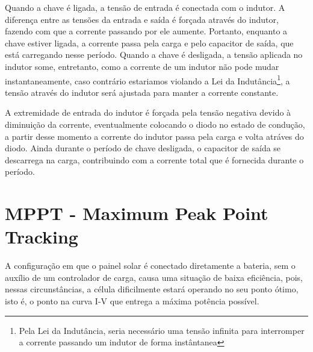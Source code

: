 \noindent
\begin{minipage}{\linewidth}
\label{buck_topology_sample}
\end{minipage}

Quando a chave é ligada, a tensão de entrada é conectada com o indutor. A diferença entre as tensões da entrada e saída é forçada através do indutor, fazendo com que a corrente passando por ele aumente. Portanto, enquanto a chave estiver ligada, a corrente passa pela carga e pelo capacitor de saída, que está carregando nesse período. Quando a chave é desligada, a tensão aplicada no indutor some, entretanto, como a corrente de um indutor não pode mudar instantaneamente, caso contrário estariamos violando a Lei da Indutância\footnote{Pela Lei da Indutância, seria necessário uma tensão infinita para interromper a corrente passando um indutor de forma instântanea}, a tensão através do indutor será ajustada para manter a corrente constante.

A extremidade de entrada do indutor é forçada pela tensão negativa devido à diminuição da corrente, eventualmente colocando o diodo no estado de condução, a partir desse momento a corrente do indutor passa pela carga e volta atráves do diodo. Ainda durante o período de chave desligada, o capacitor de saída se descarrega na carga, contribuindo com a corrente total que é fornecida durante o período. 


\section{MPPT - Maximum Peak Point Tracking}\label{mppt_revision}
A configuração em que o painel solar é conectado diretamente a bateria, sem o auxílio de um controlador de carga, causa uma situação de baixa eficiência, pois, nessas circunstâncias, a célula dificilmente estará operando no seu ponto ótimo, isto é, o ponto na curva I-V que entrega a máxima potência possível.

